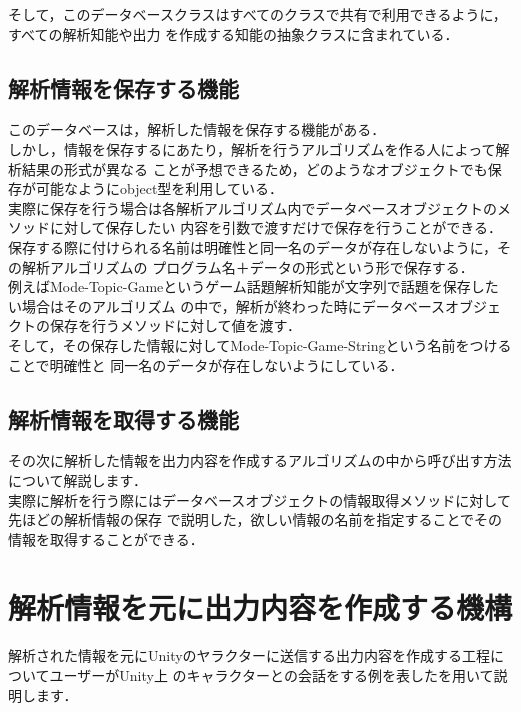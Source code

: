 そして，このデータベースクラスはすべてのクラスで共有で利用できるように，すべての解析知能や出力
を作成する知能の抽象クラスに含まれている．\\

\subsection{解析情報を保存する機能}
このデータベースは，解析した情報を保存する機能がある．\\
しかし，情報を保存するにあたり，解析を行うアルゴリズムを作る人によって解析結果の形式が異なる
ことが予想できるため，どのようなオブジェクトでも保存が可能なようにobject型を利用している．\\

実際に保存を行う場合は各解析アルゴリズム内でデータベースオブジェクトのメソッドに対して保存したい
内容を引数で渡すだけで保存を行うことができる．\\

保存する際に付けられる名前は明確性と同一名のデータが存在しないように，その解析アルゴリズムの
プログラム名＋データの形式という形で保存する．\\

例えばMode-Topic-Gameというゲーム話題解析知能が文字列で話題を保存したい場合はそのアルゴリズム
の中で，解析が終わった時にデータベースオブジェクトの保存を行うメソッドに対して値を渡す．\\

そして，その保存した情報に対してMode-Topic-Game-Stringという名前をつけることで明確性と
同一名のデータが存在しないようにしている．\\

\subsection{解析情報を取得する機能}
その次に解析した情報を出力内容を作成するアルゴリズムの中から呼び出す方法について解説します．\\
実際に解析を行う際にはデータベースオブジェクトの情報取得メソッドに対して先ほどの解析情報の保存
で説明した，欲しい情報の名前を指定することでその情報を取得することができる．\\

\newpage


\section{解析情報を元に出力内容を作成する機構}
解析された情報を元にUnityのヤラクターに送信する出力内容を作成する工程についてユーザーがUnity上
のキャラクターとの会話をする例を表したを用いて説明します．

